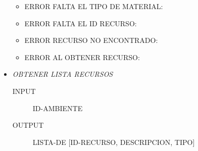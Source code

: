 \documentclass{article}
\begin{document}
\begin{description}
\begin{itemize}
\begin{itemize}
				
				
				\item ERROR FALTA EL TIPO DE MATERIAL:
				
						
								
				\item ERROR FALTA EL ID RECURSO:
				
					
				
				\item ERROR RECURSO NO ENCONTRADO:
				
								
				
				\item ERROR AL OBTENER RECURSO:
				
					
				
			\end{itemize}
			\item \emph{OBTENER LISTA RECURSOS}
			\begin{description}
				\item[INPUT] ID-AMBIENTE
				\item[OUTPUT] LISTA-DE [ID-RECURSO, DESCRIPCION, TIPO]\\
			\end{description}
			

\end{itemize}
\end{description}
\end{document}
